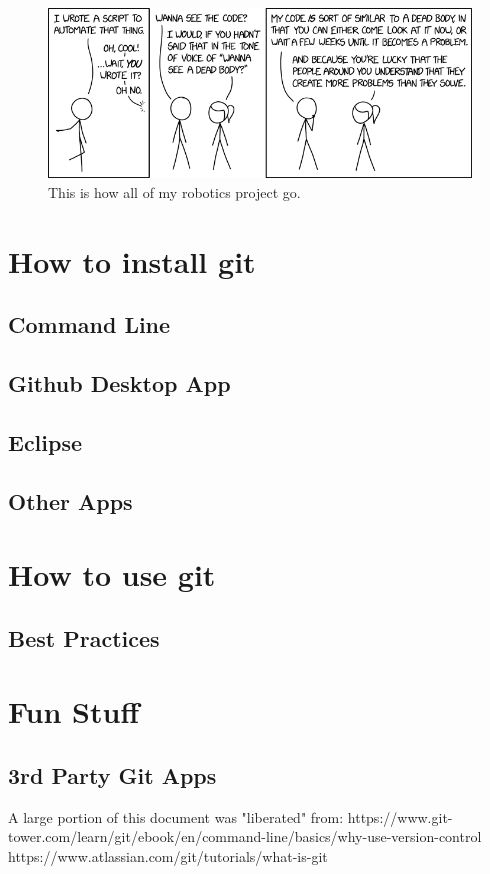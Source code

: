 \documentclass{article}
\begin{document}
\newpage{}
\thispagestyle {empty}

\vspace*{2cm}

\begin{figure}
		\includegraphics[width=5.5in]{images/wanna_see_the_code.png}
		\caption{This is how all of my robotics project go.}
\end{figure}

\section{How to install git}
\subsection{Command Line}
\subsection{Github Desktop App}
\subsection{Eclipse}
\subsection{Other Apps}

\section{How to use git}
\subsection{Best Practices}

\section{Fun Stuff}
\subsection{3rd Party Git Apps}



\begin{thebibliography}{9}
A large portion of this document was "liberated" from:
https://www.git-tower.com/learn/git/ebook/en/command-line/basics/why-use-version-control
https://www.atlassian.com/git/tutorials/what-is-git
\end{thebibliography}
\printindex
\end{document}
